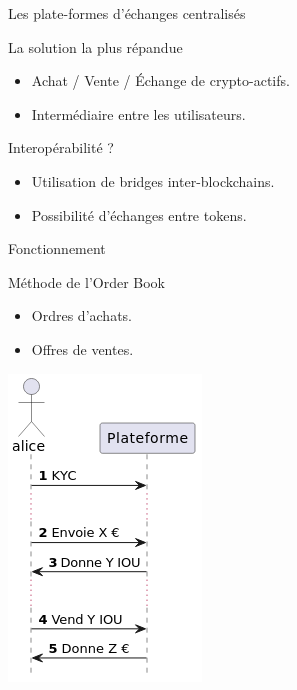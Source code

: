 \begin{frame}{Les plate-formes d'échanges centralisés}
    \begin{block}{La solution la plus répandue}
        \begin{itemize}
            \item Achat / Vente / Échange de crypto-actifs.
            \item Intermédiaire entre les utilisateurs.
        \end{itemize}
    \end{block}
    \begin{block}{Interopérabilité ?}
        \begin{itemize}
            \item Utilisation de bridges inter-blockchains.
            \item Possibilité d'échanges entre tokens.
        \end{itemize}
    \end{block}
\end{frame}

\begin{frame}{Fonctionnement}    
    \begin{block}{Méthode de l'Order Book}
        \begin{itemize}
            \item Ordres d'achats.
            \item Offres de ventes.
        \end{itemize}
    \end{block}
        \centering
        \includegraphics[scale = 0.5]{centralisation/img_plateformes/transaction.png}
\end{frame}

